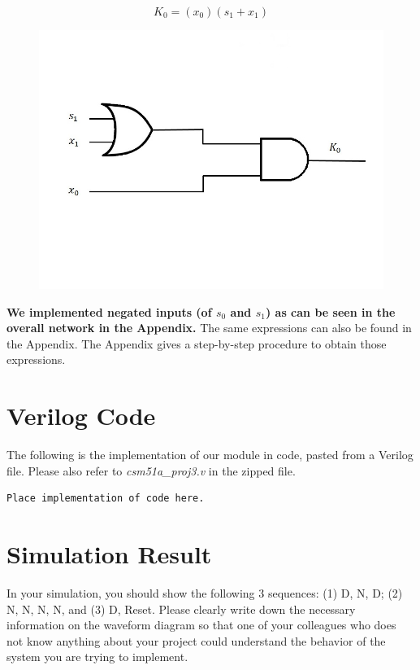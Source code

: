 \documentclass{article}
\begin{document}
\begin{equation*}
K_0 = (x_0)(s_1 + x_1)
\end{equation*}
\begin{figure}[h!]
\centering
\includegraphics[scale=0.3]{K0}
\end{figure}

\textbf{We implemented negated inputs (of $s_0$ and $s_1$) as can be seen in
the overall network in the Appendix.}
The same expressions can also be found in the Appendix. The Appendix gives a 
step-by-step procedure to obtain those expressions.


\section{Verilog Code}
The following is the implementation of our module in code, pasted from a 
Verilog file. Please also refer to \textit{csm51a\_proj3.v} in the zipped 
file.\\

\begin{verbatim}
Place implementation of code here.
\end{verbatim}


\section{Simulation Result}
In your simulation, you should show the following 3 sequences: (1) D, N, D;
(2) N, N, N, N, and (3) D, Reset. Please clearly write down the necessary 
information on the waveform diagram so that one of your colleagues who does 
not know anything about your project could understand the behavior of the 
system you are trying to implement.\\
\end{document}
